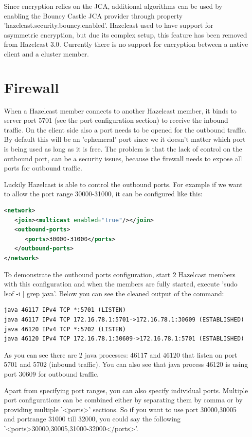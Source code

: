 Since encryption relies on the JCA, additional algorithms can be used by enabling the Bouncy Castle JCA provider through property 'hazelcast.security.bouncy.enabled'. Hazelcast used to have support for asymmetric encryption, but due its complex setup, this feature has been removed from Hazelcast 3.0. Currently there is no support for encryption between a native client and a cluster member.

\section{Firewall}
When a Hazelcast member connects to another Hazelcast member, it binds to server port 5701 (see the port configuration section) to receive the inbound traffic. On the client side also a port needs to be opened for the outbound traffic. By default this will be an 'ephemeral' port since we it doesn't matter which port is being used as long as it is free. The problem is that the lack of control on the outbound port, can be a security issues, because the firewall needs to expose all ports for outbound traffic. 

Luckily Hazelcast is able to control the outbound ports. For example if we want to allow the port range 30000-31000, it can be configured like this:
\begin{lstlisting}[language=xml]
<network>
   <join><multicast enabled="true"/></join>
   <outbound-ports>
      <ports>30000-31000</ports>
   </outbound-ports>
</network>
\end{lstlisting}
To demonstrate the outbound ports configuration, start 2 Hazelcast members with this configuration and when the members are fully started, execute 'sudo lsof -i | grep java'. Below you can see the cleaned output of the command:
\begin{lstlisting}
java 46117 IPv4 TCP *:5701 (LISTEN)
java 46117 IPv4 TCP 172.16.78.1:5701->172.16.78.1:30609 (ESTABLISHED)
java 46120 IPv4 TCP *:5702 (LISTEN)
java 46120 IPv4 TCP 172.16.78.1:30609->172.16.78.1:5701 (ESTABLISHED)
\end{lstlisting}
As you can see there are 2 java processes: 46117 and 46120 that listen on port 5701 and 5702 (inbound traffic). You can also see that java process 46120 is using port 30609 for outbound traffic.

Apart from specifying port ranges, you can also specify individual ports. Multiple port configurations can be combined either by separating them by comma or by providing multiple '<ports>' sections. So if you want to use port 30000,30005 and portrange 31000 till 32000, you could say the following '<ports>30000,30005,31000-32000</ports>'. 

